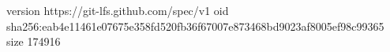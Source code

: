 version https://git-lfs.github.com/spec/v1
oid sha256:eab4e11461e07675e358fd520fb36f67007e873468bd9023af8005ef98c99365
size 174916
